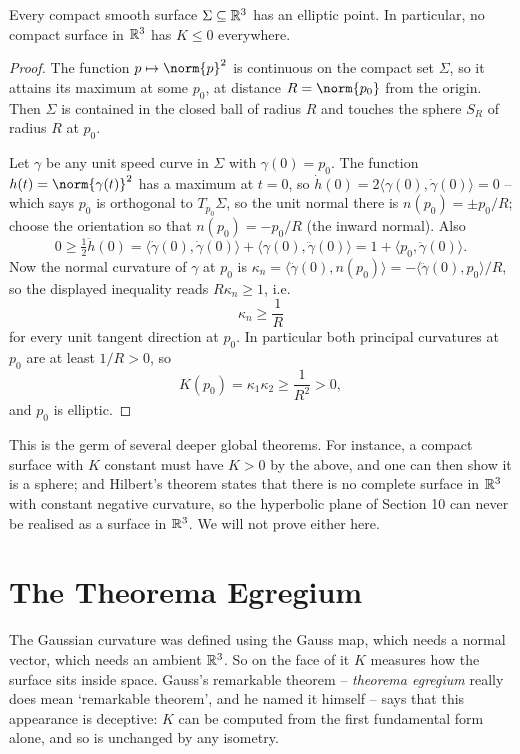 \documentclass[a4paper]{scrartcl}
\begin{document}
\begin{theorem}
    Every compact smooth surface $\Sigma \subseteq \mathbb{R}^3$ has an elliptic point. In particular, no compact surface in $\mathbb{R}^3$ has $K \leq 0$ everywhere.
\end{theorem}
\begin{proof}
    The function $p \mapsto \norm{p}^2$ is continuous on the compact set $\Sigma$, so it attains its maximum at some $p_0$, at distance $R = \norm{p_0}$ from the origin. Then $\Sigma$ is contained in the closed ball of radius $R$ and touches the sphere $S_R$ of radius $R$ at $p_0$.

    Let $\gamma$ be any unit speed curve in $\Sigma$ with $\gamma(0) = p_0$. The function $h(t) = \norm{\gamma(t)}^2$ has a maximum at $t = 0$, so $\dot h(0) = 2\langle \gamma(0), \dot\gamma(0)\rangle = 0$ -- which says $p_0$ is orthogonal to $T_{p_0}\Sigma$, so the unit normal there is $n(p_0) = \pm p_0/R$; choose the orientation so that $n(p_0) = -p_0/R$ (the inward normal). Also
    $$
    0 \geq \tfrac12\ddot h(0) = \langle \dot\gamma(0), \dot\gamma(0)\rangle + \langle \gamma(0), \ddot\gamma(0)\rangle = 1 + \langle p_0, \ddot\gamma(0)\rangle.
    $$
    Now the normal curvature of $\gamma$ at $p_0$ is $\kappa_n = \langle \ddot\gamma(0), n(p_0)\rangle = -\langle \ddot\gamma(0), p_0\rangle/R$, so the displayed inequality reads $R\kappa_n \geq 1$, i.e.
    $$
    \kappa_n \geq \frac{1}{R}
    $$
    for every unit tangent direction at $p_0$. In particular both principal curvatures at $p_0$ are at least $1/R > 0$, so
    $$
    K(p_0) = \kappa_1\kappa_2 \geq \frac{1}{R^2} > 0,
    $$
    and $p_0$ is elliptic.
\end{proof}

\begin{remark}
    This is the germ of several deeper global theorems. For instance, a compact surface with $K$ constant must have $K > 0$ by the above, and one can then show it is a sphere; and Hilbert's theorem states that there is no complete surface in $\mathbb{R}^3$ with constant negative curvature, so the hyperbolic plane of Section 10 can never be realised as a surface in $\mathbb{R}^3$. We will not prove either here.
\end{remark}

\section{The Theorema Egregium}

The Gaussian curvature was defined using the Gauss map, which needs a normal vector, which needs an ambient $\mathbb{R}^3$. So on the face of it $K$ measures how the surface sits inside space. Gauss's remarkable theorem -- \emph{theorema egregium} really does mean `remarkable theorem', and he named it himself -- says that this appearance is deceptive: $K$ can be computed from the first fundamental form alone, and so is unchanged by any isometry.
\end{document}

